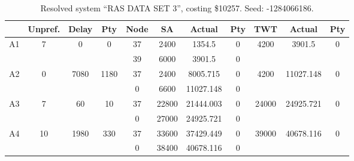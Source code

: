 \begin{sidewaystable}
\footnotesize
\caption{Resolved system ``RAS DATA SET 3'', costing \$10257. Seed: -1284066186.}
\centering
\begin{tabular}{c||c|c|c||c|c|c|c||c|c|c}
  \hline \hline
  &
  Unpref. & 
  Delay &
  Pty &
  Node &
  SA &
  Actual &
  Pty &
  TWT &
  Actual &
  Pty \\
      \hline
      \multirow{2}{*}{A1} &
      \multirow{2}{*}{7} &
      \multirow{2}{*}{0} &
      \multirow{2}{*}{0} &
      37 &
      2400 &
        1354.5 &
        0 &
      \multirow{2}{*}{4200} &
        \multirow{2}{*}{3901.5} &
        \multirow{2}{*}{0}
      \\
      \cline{5-8}
       &
       &
       &
       &
      39 &
      6000 &
        3901.5 &
        0 &
      
         &
        
      \\
      \hline
      \multirow{2}{*}{A2} &
      \multirow{2}{*}{0} &
      \multirow{2}{*}{7080} &
      \multirow{2}{*}{1180} &
      37 &
      2400 &
        8005.715 &
        0 &
      \multirow{2}{*}{4200} &
        \multirow{2}{*}{11027.148} &
        \multirow{2}{*}{0}
      \\
      \cline{5-8}
       &
       &
       &
       &
      0 &
      6600 &
        11027.148 &
        0 &
      
         &
        
      \\
      \hline
      \multirow{2}{*}{A3} &
      \multirow{2}{*}{7} &
      \multirow{2}{*}{60} &
      \multirow{2}{*}{10} &
      37 &
      22800 &
        21444.003 &
        0 &
      \multirow{2}{*}{24000} &
        \multirow{2}{*}{24925.721} &
        \multirow{2}{*}{0}
      \\
      \cline{5-8}
       &
       &
       &
       &
      0 &
      27000 &
        24925.721 &
        0 &
      
         &
        
      \\
      \hline
      \multirow{2}{*}{A4} &
      \multirow{2}{*}{10} &
      \multirow{2}{*}{1980} &
      \multirow{2}{*}{330} &
      37 &
      33600 &
        37429.449 &
        0 &
      \multirow{2}{*}{39000} &
        \multirow{2}{*}{40678.116} &
        \multirow{2}{*}{0}
      \\
      \cline{5-8}
       &
       &
       &
       &
      0 &
      38400 &
        40678.116 &
        0 &
      

\end{tabular}
\end{sidewaystable}
